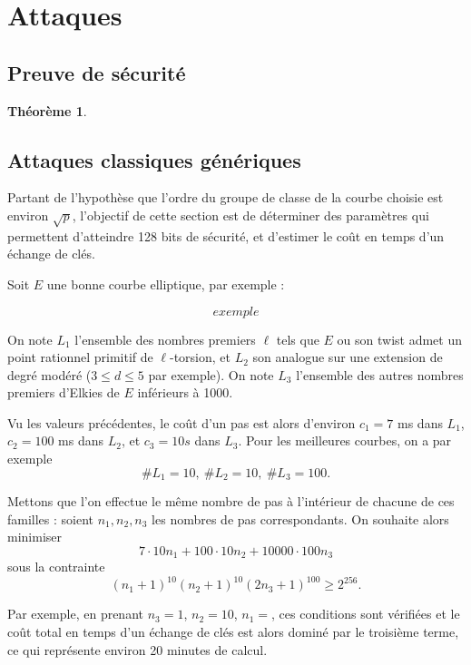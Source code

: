 \documentclass[11pt,a4paper]{article}
\newtheorem*{thm}{Théorème}
\theoremstyle{definition}
\begin{document}
\newpage

\section{Attaques}


\subsection{Preuve de sécurité}


\begin{thm}

\end{thm}


\subsection{Attaques classiques génériques}

Partant de l'hypothèse que l'ordre du groupe de classe de la courbe choisie est environ $\sqrt{p}$, l'objectif de cette section est de déterminer des paramètres qui permettent d'atteindre 128 bits de sécurité, et d'estimer le coût en temps d'un échange de clés.

Soit $E$ une bonne courbe elliptique, par exemple :

$$exemple$$

On note $L_1$ l'ensemble des nombres premiers $\ell$ tels que $E$ ou son twist admet un point rationnel primitif de $\ell$-torsion, et $L_2$ son analogue sur une extension de degré modéré ($3\leq d\leq 5$ par exemple). On note $L_3$ l'ensemble des autres nombres premiers d'Elkies de $E$ inférieurs à 1000.

Vu les valeurs précédentes, le coût d'un pas est alors d'environ $c_1 = 7$ ms dans $L_1$, $c_2 = 100$ ms dans $L_2$, et $c_3 = 10 s$ dans $L_3$. Pour les meilleures courbes, on a par exemple
$$\# L_1 = 10,\ \# L_2 = 10,\ \# L_3 = 100.$$

Mettons que l'on effectue le même nombre de pas à l'intérieur de chacune de ces familles : soient $n_1, n_2, n_3$ les nombres de pas correspondants. On souhaite alors minimiser
$$ 7\cdot 10 n_1 + 100\cdot 10 n_2 + 10000 \cdot 100 n_3$$
sous la contrainte
$$ (n_1 + 1)^{10}(n_2 + 1)^{10}(2 n_3 + 1)^{100} \geq 2^{256}.$$

Par exemple, en prenant $n_3 = 1$, $n_2 = 10$, $n_1 = $, ces conditions sont vérifiées et le coût total en temps d'un échange de clés est alors dominé par le troisième terme, ce qui représente environ 20 minutes de calcul.
\end{document}
